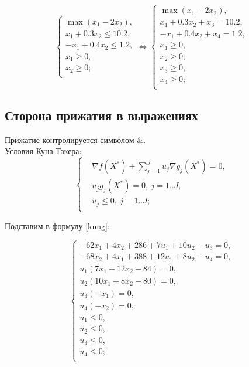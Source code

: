 \begin{equation*}
\left\{\begin{aligned}
\max\left(x_1-2x_2\right), \\
x_1+0.3x_2\leq 10.2, \\
-x_1+0.4x_2\leq 1.2, \\
x_1\geq 0, \\
x_2\geq 0; \\
\end{aligned}\right. \Longleftrightarrow
\left\{\begin{aligned}
\max\left(x_1-2x_2\right), \\
x_1+0.3x_2+x_3=10.2, \\
-x_1+0.4x_2+x_4=1.2, \\
x_1\geq 0, \\
x_2\geq 0; \\
x_3\geq 0, \\
x_4\geq 0; \\
\end{aligned}\right.
\end{equation*}

\subsection{Сторона прижатия в выражениях}

Прижатие контролируется символом \&. \\

Условия Куна-Такера:
\begin{equation}
\left\{\begin{aligned}
&\nabla f(X^*)+\sum_{j=1}^{J} u_j \nabla g_j(X^*)=0,\\
&u_j g_j(X^*)=0,~ j=1..J,\\
&u_j \leq 0,~ j=1..J;\\
\end{aligned}\right.
\label{kung}
\end{equation}

Подставим в формулу \eqref{kung}:

\begin{equation*}
\left\{\begin{aligned}
-62x_1+4x_2+286+7u_1+10u_2-u_3=0,\\
-68x_2+4x_1+388+12u_1+8u_2-u_4=0,\\
u_1(7x_1+12x_2-84)=0,\\
u_2(10x_1+8x_2-80)=0,\\
u_3(-x_1)=0,\\
u_4(-x_2)=0,\\
u_1\leq 0,\\
u_2\leq 0,\\
u_3\leq 0,\\
u_4\leq 0;\\
\end{aligned}\right.
\end{equation*}

